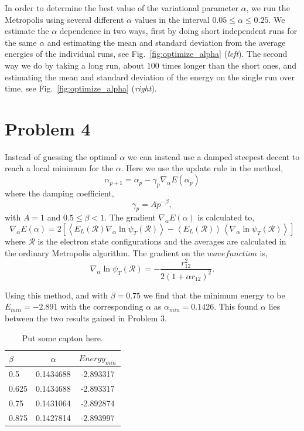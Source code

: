 In order to determine the best value of the variational parameter $\alpha$, we run the Metropolis using several different $\alpha$ values in the interval $0.05 \leq \alpha \leq 0.25$. We estimate the $\alpha$ dependence in two ways, first by doing short independent runs for the same $\alpha$ and estimating the mean and standard deviation from the average energies of the individual runs, see Fig.~\ref{fig:optimize_alpha} (\textit{left}). The second way we do by taking a long run, about $100$ times longer than the short ones, and estimating the mean and standard deviation of the energy on the single run over time, see Fig.~\ref{fig:optimize_alpha} (\textit{right}). 

\section*{Problem 4}

Instead of guessing the optimal $\alpha$ we can instead use a damped steepest decent to reach a local minimum for the $\alpha$. Here we use the update rule in the method,
\begin{equation}
\alpha_{p+1} = \alpha_p-\gamma_p \nabla_\alpha E(\alpha_p)
\end{equation} 
where the damping coefficient,
\begin{equation}
\gamma_p=Ap^{-\beta},
\end{equation}
with $A=1$ and $0.5\leq\beta < 1$. The gradient $\nabla_\alpha E(\alpha)$ is calculated to,
\begin{equation}
\nabla_\alpha E(\alpha) = 2\left[\left<E_L(\mathcal{R})\nabla_\alpha \ln{\psi_T(\mathcal{R})}\right>-\left<E_L(\mathcal{R})\right>\left<\nabla_\alpha\ln{\psi_T(\mathcal{R})}\right>\right]
\end{equation}
where $\mathcal{R}$ is the electron state configurations and the averages are calculated in the ordinary Metropolis algorithm. The gradient on the $wave function $ is,
\begin{equation}
\nabla_\alpha \ln{\psi_T(\mathcal{R})} = -\frac{r_{12}^2}{2(1+\alpha r_{12})^2}.
\end{equation}

Using this method, and with $\beta = 0.75$ we find that the minimum energy to be $E_{min}=-2.891$ with the corresponding $\alpha$ as $\alpha_{min}=0.1426$. This found $\alpha$ lies between the two results gained in Problem 3.

\begin{table}[H]
	\centering
	\caption{Put some capton here.}
	\begin{tabular}{|l|cc|}
		\hline $\beta$ & $\alpha$ & $Energy_{min}$ \\ \hline
		 0.5 & 0.1434688 & -2.893317 \\ \hline
		 0.625 & 0.1434688 & -2.893317 \\ \hline
		 0.75 & 0.1431064 & -2.892874 \\ \hline
		 0.875 & 0.1427814 & -2.893997 \\ \hline
	\end{tabular}
	\label{tab:prob5}
\end{table}



